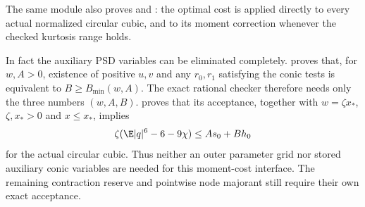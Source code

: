 The same module also proves  and : the optimal cost is applied directly to every actual normalized circular cubic, and to its moment correction whenever the checked kurtosis range holds.


In fact the auxiliary PSD variables can be eliminated completely.
 proves that, for $w,A>0$, existence of positive
$u,v$ and any $r_0,r_1$ satisfying the conic tests is equivalent to
$B\ge B_{\min}(w,A)$. The exact rational checker
 therefore needs only the three numbers $(w,A,B)$.
 proves that its acceptance, together with
$w=\zeta x_*$, $\zeta,x_*>0$ and $x\le x_*$, implies
\[
 \zeta(\E|q|^6-6-9\chi)\le A s_0+B h_0
\]
for the actual circular cubic. Thus neither an outer parameter grid nor
stored auxiliary conic variables are needed for this moment-cost interface.
The remaining contraction reserve and pointwise node majorant still require
their own exact acceptance.
